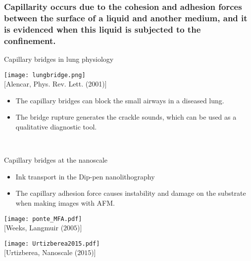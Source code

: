 \documentclass[8pt]{beamer}
\begin{document}
\begin{frame}
\frametitle{Capillarity occurs due to the \textbf{cohesion and adhesion forces} between the surface of a liquid and another medium, and it is evidenced when this liquid is subjected to the confinement.}
	\begin{minipage}{0.47\textwidth}
		\begin{block}{Capillary bridges in lung physiology}
		    \begin{center}
		    	\texttt{[image: lungbridge.png]}\\
		    	\tiny{[Alencar, Phys. Rev. Lett. (2001)]}
	    	\end{center} 
			\begin{itemize}
			    \item The capillary bridges can block the small airways in a diseased lung.
			    \item The bridge rupture generates the crackle sounds, which can be used as a qualitative diagnostic tool.
			\end{itemize}	    	
		\end{block}
	\end{minipage}
	~~~~~
	\begin{minipage}{0.47\textwidth}
		\begin{block}{Capillary bridges at the nanoscale}
			\begin{itemize}
			    \item Ink transport in the Dip-pen nanolithography
			    \item The capillary adhesion force causes instability and damage on the substrate when making images with AFM.
			\end{itemize}
			\begin{minipage}{0.48\textwidth}
				\begin{center}
					\texttt{[image: ponte\_MFA.pdf]}\\
		    		\tiny{[Weeks, Langmuir ($2005$)]}			
				\end{center}		
			\end{minipage}
		    \begin{minipage}{0.48\textwidth}
				\begin{center}
					\texttt{[image: Urtizberea2015.pdf]}\\
					\tiny{[Urtizberea, Nanoscale ($2015$)]}		
				\end{center}		
			\end{minipage}			
		\end{block}
	\end{minipage}	
\end{frame}
\end{document}
